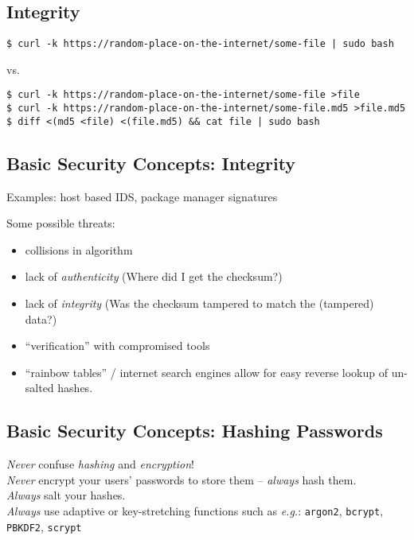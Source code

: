 \documentclass[xga]{xdvislides}
\begin{document}
\subsection{Integrity}
\begin{verbatim}
$ curl -k https://random-place-on-the-internet/some-file | sudo bash
\end{verbatim}

vs.

\begin{verbatim}
$ curl -k https://random-place-on-the-internet/some-file >file
$ curl -k https://random-place-on-the-internet/some-file.md5 >file.md5
$ diff <(md5 <file) <(file.md5) && cat file | sudo bash 
\end{verbatim}


\subsection{Basic Security Concepts: Integrity}
Examples: host based IDS, package manager signatures

\vspace{.5in}
Some possible threats:
\begin{itemize}
	\item collisions in algorithm
	\item lack of {\em authenticity} (Where did I get the checksum?)
	\item lack of {\em integrity} (Was the checksum tampered to match the (tampered) data?)
	\item ``verification'' with compromised tools
	\item ``rainbow tables'' / internet search engines allow for easy reverse
		lookup of un-salted hashes.
\end{itemize}

\subsection{Basic Security Concepts: Hashing Passwords}
{\em Never} confuse {\em hashing} and {\em encryption}! \\

{\em Never} encrypt your users' passwords to store them -- {\em always} hash them. \\

\addvspace{.25in}
{\em Always} salt your hashes. \\

{\em Always} use adaptive or key-stretching functions
such as {\em e.g.}: {\tt argon2}, {\tt bcrypt}, {\tt PBKDF2}, {\tt scrypt} \\
\end{document}
